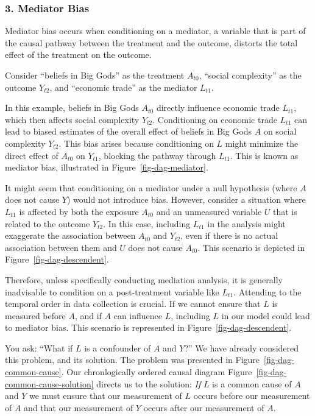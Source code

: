 \documentclass[
  singlecolumn,
  9pt]{article}
\begin{document}
\subsubsection{3. Mediator Bias}\label{mediator-bias}

Mediator bias occurs when conditioning on a mediator, a variable that is
part of the causal pathway between the treatment and the outcome,
distorts the total effect of the treatment on the outcome.

Consider ``beliefs in Big Gods'' as the treatment \(A_{t0}\), ``social
complexity'' as the outcome \(Y_{t2}\), and ``economic trade'' as the
mediator \(L_{t1}\).

In this example, beliefs in Big Gods \(A_{t0}\) directly influence
economic trade \(L_{t1}\), which then affects social complexity
\(Y_{t2}\). Conditioning on economic trade \(L_{t1}\) can lead to biased
estimates of the overall effect of beliefs in Big Gods \(A\) on social
complexity \(Y_{t2}\). This bias arises because conditioning on \(L\)
might minimize the direct effect of \(A_{t0}\) on \(Y_{t1}\), blocking
the pathway through \(L_{t1}\). This is known as mediator bias,
illustrated in Figure~\ref{fig-dag-mediator}.

It might seem that conditioning on a mediator under a null hypothesis
(where \(A\) does not cause \(Y\)) would not introduce bias. However,
consider a situation where \(L_{t1}\) is affected by both the exposure
\(A_{t0}\) and an unmeasured variable \(U\) that is related to the
outcome \(Y_{t2}\). In this case, including \(L_{t1}\) in the analysis
might exaggerate the association between \(A_{t0}\) and \(Y_{t2}\), even
if there is no actual association between them and \(U\) does not cause
\(A_{t0}\). This scenario is depicted in
Figure~\ref{fig-dag-descendent}.

Therefore, unless specifically conducting mediation analysis, it is
generally inadvisable to condition on a post-treatment variable like
\(L_{t1}\). Attending to the temporal order in data collection is
crucial. If we cannot ensure that \(L\) is measured before \(A\), and if
\(A\) can influence \(L\), including \(L\) in our model could lead to
mediator bias. This scenario is represented in
Figure~\ref{fig-dag-descendent}.

You ask: ``What if \(L\) is a confounder of \(A\) and \(Y\)?'' We have
already considered this problem, and its solution. The problem was
presented in Figure~\ref{fig-dag-common-cause}. Our chronlogically
ordered causal diagram Figure~\ref{fig-dag-common-cause-solution}
directs us to the solution: \emph{If} \(L\) is a common cause of \(A\)
and \(Y\) we must ensure that our measurement of \(L\) occurs before our
measurement of \(A\) and that our measurement of \(Y\) occurs after our
measurement of \(A\).
\end{document}
